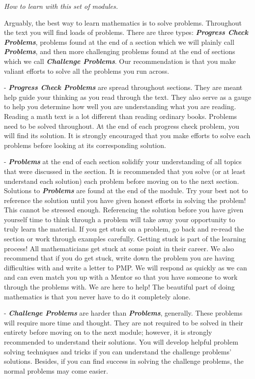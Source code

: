 \documentclass{amsart}
\numberwithin{equation}{section}
\theoremstyle{plain} %
\theoremstyle{definition}
\theoremstyle{remark}
\begin{document}
\textit{How to learn with this set of modules.}%

 Arguably, the best way to learn mathematics is to solve problems. Throughout the text you will find loads of problems. There are three types: \textbf{\textit{Progress Check Problems}}, problems found at the end of a section which we will plainly call \textbf{\textit{Problems}}, and then more challenging problems found at the end of sections which we call \textbf{\textit{Challenge Problems}}. Our recommendation is that you make valiant efforts to solve all the problems you run across. 
 
 - \textbf{\textit{Progress Check Problems}} are spread throughout sections. They are meant help guide your thinking as you read through the text. They also serve as a gauge to help you determine how well you are understanding what you are reading. Reading a math text is a lot different than reading ordinary books. Problems need to be solved throughout. At the end of each progress check problem, you will find its solution. It is strongly encouraged that you make efforts to solve each problems before looking at its corresponding solution.

-  \textbf{\textit{Problems}} at the end of each section solidify your understanding of all topics that were discussed in the section. It is recommended that you solve (or at least understand each solution) each problem before moving on to the next section. Solutions to \textbf{\textit{Problems}} are found at the end of the module. Try your best not to reference the solution until you have given honest efforts in solving the problem! This cannot be stressed enough. Referencing the solution before you have given yourself time to think through a problem will take away your opportunity to truly learn the material. If you get stuck on a problem, go back and re-read the section or work through examples carefully. Getting stuck is part of the learning process! All mathematicians get stuck at some point in their career. We also recommend that if you do get stuck, write down the problem you are having difficulties with and write a letter to PMP. We will respond as quickly as we can and can even match you up with a Mentor so that you have someone to work through the problems with. We are here to help! The beautiful part of doing mathematics is that you never have to do it completely alone.



- \textbf{\textit{Challenge Problems}} are harder than \textbf{\textit{Problems}}, generally. These problems will require more time and thought. They are not required to be solved in their entirety before moving on to the next module; however, it is strongly recommended to understand their solutions. You will develop helpful problem solving techniques and tricks if you can understand the challenge problems' solutions. Besides, if you can find success in solving the challenge problems, the normal problems may come easier.
\end{document}
